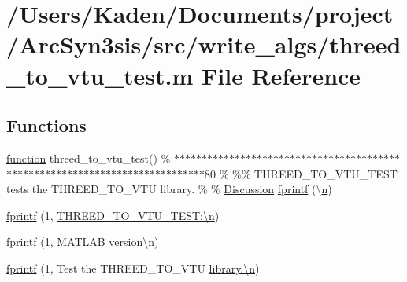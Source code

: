 \hypertarget{a00617}{}\section{/\+Users/\+Kaden/\+Documents/project/\+Arc\+Syn3sis/src/write\+\_\+algs/threed\+\_\+to\+\_\+vtu\+\_\+test.m File Reference}
\label{a00617}
\subsection*{Functions}
\begin{DoxyCompactItemize}
\item 
\hyperlink{a00611_a2420833d971716e9bab41cc9fb3abba1}{function} threed\+\_\+to\+\_\+vtu\+\_\+test() \% $\ast$$\ast$$\ast$$\ast$$\ast$$\ast$$\ast$$\ast$$\ast$$\ast$$\ast$$\ast$$\ast$$\ast$$\ast$$\ast$$\ast$$\ast$$\ast$$\ast$$\ast$$\ast$$\ast$$\ast$$\ast$$\ast$$\ast$$\ast$$\ast$$\ast$$\ast$$\ast$$\ast$$\ast$$\ast$$\ast$$\ast$$\ast$$\ast$$\ast$$\ast$$\ast$$\ast$$\ast$$\ast$$\ast$$\ast$$\ast$$\ast$$\ast$$\ast$$\ast$$\ast$$\ast$$\ast$$\ast$$\ast$$\ast$$\ast$$\ast$$\ast$$\ast$$\ast$$\ast$$\ast$$\ast$$\ast$$\ast$$\ast$$\ast$$\ast$$\ast$$\ast$$\ast$$\ast$$\ast$$\ast$80 \% \%\% T\+H\+R\+E\+E\+D\+\_\+\+T\+O\+\_\+\+V\+T\+U\+\_\+\+T\+E\+ST tests the T\+H\+R\+E\+E\+D\+\_\+\+T\+O\+\_\+\+V\+TU library. \% \% \hyperlink{a00611_afb022d1087d237270af4fbdcc4cce30e}{Discussion} \hyperlink{a00617_aa2746ddf3ca9b8454b1ba2969534de4d}{fprintf} (\textquotesingle{}\textbackslash{}\hyperlink{a00623_a781a04ab095280f838ff3eb0e51312e0}{n}\textquotesingle{})
\item 
\hyperlink{a00617_aadf38edcc378853a55f39e769ef5f257}{fprintf} (1, \textquotesingle{}\hyperlink{a00623_a781a04ab095280f838ff3eb0e51312e0}{T\+H\+R\+E\+E\+D\+\_\+\+T\+O\+\_\+\+V\+T\+U\+\_\+\+T\+E\+S\+T\+:\textbackslash{}n}\textquotesingle{})
\item 
\hyperlink{a00617_a757bcd9ebd02980b55f04280d425616c}{fprintf} (1, \textquotesingle{} M\+A\+T\+L\+AB \hyperlink{a00623_a781a04ab095280f838ff3eb0e51312e0}{version\textbackslash{}n}\textquotesingle{})
\item 
\hyperlink{a00617_a50f7bcf824d23471e661ceb6dcc095d5}{fprintf} (1, \textquotesingle{} Test the T\+H\+R\+E\+E\+D\+\_\+\+T\+O\+\_\+\+V\+TU \hyperlink{a00623_a781a04ab095280f838ff3eb0e51312e0}{library.\textbackslash{}n}\textquotesingle{})

\end{DoxyCompactItemize}
